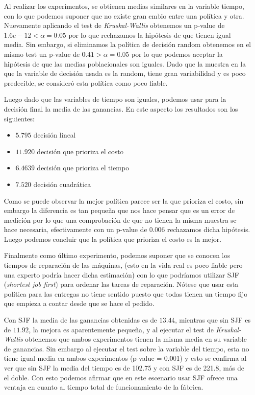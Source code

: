 \documentclass[10pt,twocolumn]{article}
\begin{document}
Al realizar los experimentos, se obtienen medias similares en la variable tiempo, con lo que podemos suponer que no existe gran cmbio entre una política y otra. Nuevamente aplicando el test de \textit{Kruskal-Wallis} obtenemos un p-value de $1.6e-12 < \alpha = 0.05$ por lo que rechazamos la hipótesis de que tienen igual media. Sin embargo, si eliminamos la política de decisión random obtenemos en el mismo test un p-value de $0.41 > \alpha = 0.05$ por lo que podemos aceptar la hipótesis de que las medias poblacionales son iguales. Dado que la muestra en la que la variable de decisión usada es la random, tiene gran variabilidad y es poco predecible, se consideró esta política como poco fiable.

Luego dado que las variables de tiempo son iguales, podemos usar para la decisión final la media de las ganancias. En este aspecto los resultados son los siguientes:

\begin{itemize}
    \item $5.795$ decisión lineal
    \item $11.920$ decisión que prioriza el costo
    \item $6.4639$ decisión que prioriza el tiempo
    \item $7.520$ decisión cuadrática
\end{itemize}

Como se puede observar la mejor política parece ser la que prioriza el costo, sin embargo la diferencia es tan pequeña que nos hace pensar que es un error de medición por lo que una comprobación de que no tienen la misma muestra se hace necesaria, efectivamente con un p-value de $0.006$ rechazamos dicha hipótesis. Luego podemos concluir que la política que prioriza el costo es la mejor.

Finalmente como último experimento, podemos suponer que se conocen los tiempos de reparación de las máquinas, (esto en la vida real es poco fiable pero una experto podría hacer dicha estimación) con lo que podríamos utilizar SJF (\textit{shortest job first}) para ordenar las tareas de reparación. Nótese que usar esta política para las entregas no tiene sentido puesto que todas tienen un tiempo fijo que empieza a contar desde que se hace el pedido.

Con SJF la media de las ganancias obtenidas es de $13.44$, mientras que sin SJF es de $11.92$, la mejora es aparentemente pequeña, y al ejecutar el test de \textit{Kruskal-Wallis} obtenemos que ambos experimentos tienen la misma media en su variable de ganancias. Sin embargo al ejecutar el test sobre la variable del tiempo, esta no tiene igual media en ambos experimentos (p-value = 0.001) y esto se confirma al ver que sin SJF la media del tiempo es de 102.75 y con SJF es de 221.8, más de el doble. Con esto podemos afirmar que en este escenario usar SJF ofrece una ventaja en cuanto al tiempo total de funcionamiento de la fábrica.
\end{document}
